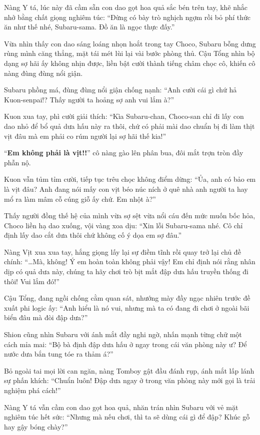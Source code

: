\documentclass[../main.tex]{subfiles}
\begin{document}
Nàng Y tá, lúc này đã cầm sẵn con dao gọt hoa quả sắc bén trên tay, khẽ nhắc nhở bằng chất giọng nghiêm túc:
``Đừng có bày trò nghịch ngợm rồi bỏ phí thức ăn như thế nhé, Subaru-sama. Đồ ăn là ngọc thực đấy.''

Vừa nhìn thấy con dao sáng loáng nhọn hoắt trong tay Choco, Subaru bỗng dưng rùng mình căng thẳng, mặt tái mét lùi lại vài bước phòng thủ. Cậu Tổng nhìn bộ dạng sợ hãi ấy không nhịn được, liền bật cười thành tiếng châm chọc cô, khiến cô nàng đùng đùng nổi giận.

Subaru phồng má, đùng đùng nổi giận chống nạnh:
``Anh cười cái gì chứ hả Kuon-senpai!? Thấy người ta hoảng sợ anh vui lắm à?''

Kuon xua tay, phì cười giải thích:
``Kìa Subaru-chan, Choco-san chỉ đi lấy con dao nhỏ để bổ quả dưa hấu này ra thôi, chứ có phải mài dao chuẩn bị đi làm thịt vịt đâu mà em phải co rúm người lại sợ hãi thế kia!''

``\textbf{Em không phải là vịt!!}'' cô nàng gào lên phân bua, đôi mắt trợn tròn đầy phẫn nộ.

Kuon vẫn tủm tỉm cười, tiếp tục trêu chọc không điểm dừng:
``Ủa, anh có bảo em là vịt đâu? Anh đang nói mấy con vịt béo núc ních ở quê nhà anh người ta hay mổ ra làm mâm cỗ cúng giỗ ấy chứ. Em nhột à?''

Thấy người đồng thế hệ của mình vừa sợ sệt vừa nổi cáu đến mức muốn bốc hỏa, Choco liền hạ dao xuống, vội vàng xoa dịu:
``Xin lỗi Subaru-sama nhé. Cô chỉ định lấy dao cắt dưa thôi chứ không cố ý dọa em sợ đâu.''

Nàng Vịt xua xua tay, hắng giọng lấy lại sự điềm tĩnh rồi quay trở lại chủ đề chính:
``\dots Mà, không! Ý em hoàn toàn không phải vậy! Em chỉ định nói rằng nhân dịp có quả dưa này, chúng ta hãy chơi trò bịt mắt đập dưa hấu truyền thống đi thôi! Vui lắm đó!''

Cậu Tổng, đang ngồi chống cằm quan sát, nhướng mày đầy ngạc nhiên trước đề xuất phi logic ấy:
``Anh hiểu là nó vui, nhưng mà ta có đang đi chơi ở ngoài bãi biển đâu mà đòi đập dưa?''

Shion cũng nhìn Subaru với ánh mắt đầy nghi ngờ, nhấn mạnh từng chữ một cách mỉa mai:
``Bộ bà định đập dưa hấu ở ngay trong cái văn phòng này ư? Để nước dưa bắn tung tóe ra thảm á?''

Bỏ ngoài tai mọi lời can ngăn, nàng Tomboy gật đầu đánh rụp, ánh mắt lấp lánh sự phấn khích:
``Chuẩn luôn! Đập dưa ngay ở trong văn phòng này mới gọi là trải nghiệm phá cách!''

Nàng Y tá vẫn cầm con dao gọt hoa quả, nhăn trán nhìn Subaru với vẻ mặt nghiêm túc hết sức:
``Nhưng mà nếu chơi, thì ta sẽ dùng cái gì để đập? Khúc gỗ hay gậy bóng chày?''
\end{document}
